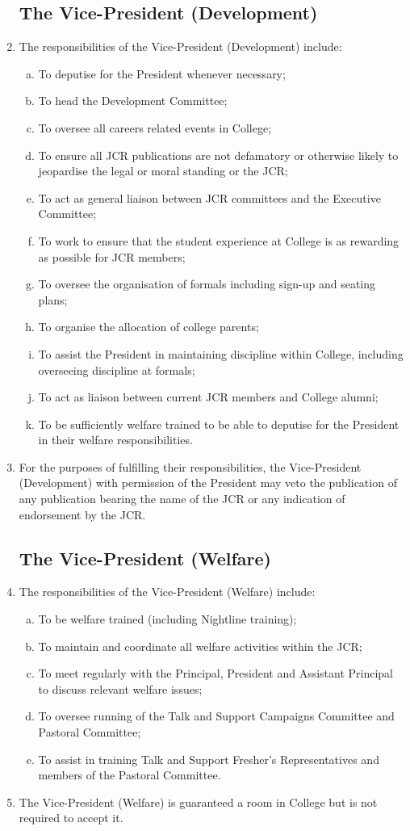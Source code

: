 \documentclass[12pt]{article}  %
\begin{document}
\begin{enumerate}
	\subsection{The Vice-President (Development)}
	\item The responsibilities of the Vice-President (Development) include:
	\begin{enumerate}[(a)]
		\item To deputise for the President whenever necessary;
		\item To head the Development Committee;
		\item To oversee all careers related events in College;
		\item To ensure all JCR publications are not defamatory or otherwise likely to jeopardise the legal or moral standing or the JCR;
		\item To act as general liaison between JCR committees and the Executive Committee;
		\item To work to ensure that the student experience at College is as rewarding as possible for JCR members;
		\item To oversee the organisation of formals including sign-up and seating plans;
		\item To organise the allocation of college parents;
		\item To assist the President in maintaining discipline within College, including overseeing discipline at formals;
		\item To act as liaison between current JCR members and College alumni;
		\item To be sufficiently welfare trained to be able to deputise for the President in their welfare responsibilities.
	\end{enumerate}
	\item For the purposes of fulfilling their responsibilities, the Vice-President (Development) with permission of the President may veto the publication of any publication bearing the name of the JCR or any indication of endorsement by the JCR.
	\subsection{The Vice-President (Welfare)}
	\item The responsibilities of the Vice-President (Welfare) include:
	\begin{enumerate}[(a)]
		\item To be welfare trained (including Nightline training);
		\item To maintain and coordinate all welfare activities within the JCR;
		\item To meet regularly with the Principal, President and Assistant Principal to discuss relevant welfare issues;
		\item To oversee running of the Talk and Support Campaigns Committee and Pastoral Committee;
		\item To assist in training Talk and Support Fresher's Representatives and members of the Pastoral Committee.
	\end{enumerate}
	\item The Vice-President (Welfare) is guaranteed a room in College but is not required to accept it.

\end{enumerate}
\end{document}
